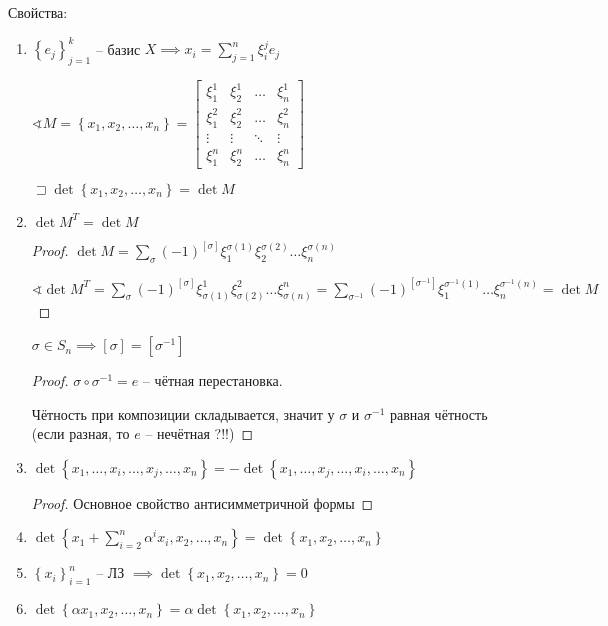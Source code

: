 \documentclass{book}
\theoremstyle{definition}
\begin{document}
Свойства:
\begin{enumerate}
    \item[] $\left\{ e_j \right\} _{j=1}^k$ -- базис $X \implies x_i = \sum_{j=1}^{n} \xi_i^je_j$

        $\sphericalangle M = \left\{ x_1, x_2, \ldots, x_n \right\}  = \begin{bmatrix} \xi_1^1 & \xi_2^1 & \ldots & \xi_n^1 \\ \xi_1^2 & \xi_2^2 & \ldots &\xi_n^2\\ \vdots & \vdots &\ddots & \vdots\\ \xi_1^n & \xi_2^n & \ldots & \xi_n^n  \end{bmatrix} $ 

        $\sqsupset \det \left\{ x_1,x_2, \ldots, x_n \right\}  = \det M$
    \item $\det M^T = \det M$

        \begin{proof}
            $\det M = \sum_{\sigma}(-1)^{\left[ \sigma \right] }\xi_1^{\sigma(1)}\xi_2^{\sigma(2)} \ldots \xi_n^{\sigma(n)}$

            $\sphericalangle \det M^T = \sum_{\sigma}(-1)^{\left[ \sigma \right] }\xi^1_{\sigma(1)}\xi^2_{\sigma(2)} \ldots \xi^n_{\sigma(n)} = \sum_{\sigma^{-1}}(-1)^{\left[ \sigma^{-1} \right]} \xi_1^{\sigma^{-1}(1)}\ldots \xi_n^{\sigma^{-1}(n)} = \det M$
        \end{proof}

        \begin{lemma}
            $\sigma \in S_n \implies \left[ \sigma \right]  = \left[ \sigma^{-1} \right] $
        \end{lemma}
        \begin{proof}
            $\sigma \circ \sigma^{-1} = e$ -- чётная перестановка. 

            Чётность при композиции складывается, значит у $\sigma$ и  $\sigma^{-1}$ равная чётность (если разная, то  $e$ -- нечётная ?!!)
        \end{proof}
    \item $\det \left\{ x_1, \ldots, x_i, \ldots, x_j, \ldots, x_n \right\} = -\det \left\{ x_1, \ldots, x_j, \ldots, x_i, \ldots, x_n \right\} $
        \begin{proof}
            Основное свойство антисимметричной формы
        \end{proof}
    \item $\det \left\{ x_1+\sum_{i=2}^{n} \alpha^ix_i, x_2, \ldots, x_n \right\} = \det \left\{ x_1, x_2, \ldots, x_n \right\} $
    \item $\left\{ x_i \right\} _{i=1}^n$ -- ЛЗ $\implies \det \left\{ x_1, x_2, \ldots, x_n \right\} = 0$
    \item $\det \left\{ \alpha x_1, x_2, \ldots, x_n \right\} = \alpha \det \left\{x_1, x_2, \ldots, x_n  \right\} $ 


\end{enumerate}
\end{document}
